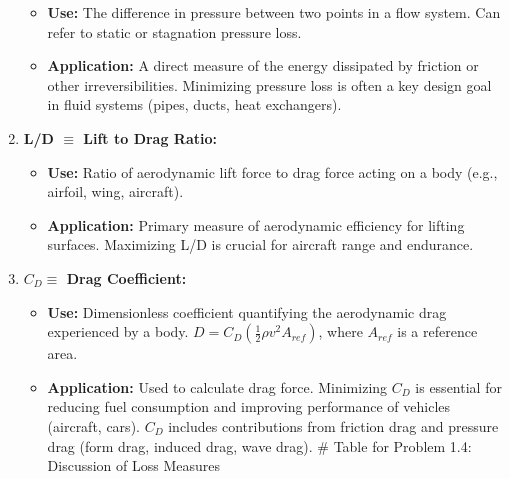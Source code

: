 \begin{enumerate}
  \begin{itemize}
  \tightlist
  \item
    \textbf{Use:} The difference in pressure between two points in a
    flow system. Can refer to static or stagnation pressure loss.
  \item
    \textbf{Application:} A direct measure of the energy dissipated by
    friction or other irreversibilities. Minimizing pressure loss is
    often a key design goal in fluid systems (pipes, ducts, heat
    exchangers).
  \end{itemize}
\item
  \textbf{L/D \(\equiv\) Lift to Drag Ratio:}

  \begin{itemize}
  \tightlist
  \item
    \textbf{Use:} Ratio of aerodynamic lift force to drag force acting
    on a body (e.g., airfoil, wing, aircraft).
  \item
    \textbf{Application:} Primary measure of aerodynamic efficiency for
    lifting surfaces. Maximizing L/D is crucial for aircraft range and
    endurance.
  \end{itemize}
\item
  \textbf{\(C_D \equiv\) Drag Coefficient:}

  \begin{itemize}
  \tightlist
  \item
    \textbf{Use:} Dimensionless coefficient quantifying the aerodynamic
    drag experienced by a body.
    \(D = C_D (\frac{1}{2} \rho v^2 A_{ref})\), where \(A_{ref}\) is a
    reference area.
  \item
    \textbf{Application:} Used to calculate drag force. Minimizing
    \(C_D\) is essential for reducing fuel consumption and improving
    performance of vehicles (aircraft, cars). \(C_D\) includes
    contributions from friction drag and pressure drag (form drag,
    induced drag, wave drag). \# Table for Problem 1.4: Discussion of
    Loss Measures
  \end{itemize}
\end{enumerate}

